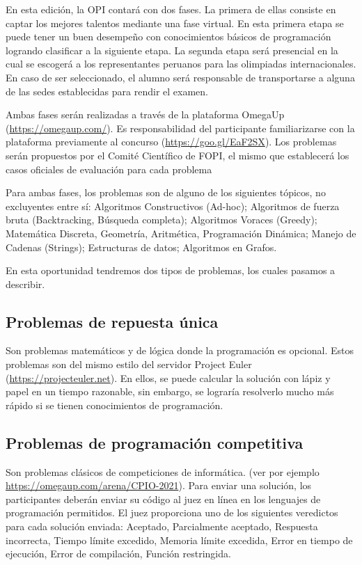 \documentclass{article}
\begin{document}
En esta edición, la OPI contará con dos fases. La primera de ellas consiste en captar los mejores talentos mediante una fase virtual. En esta primera etapa se puede tener un buen desempeño con conocimientos básicos de programación logrando clasificar a la siguiente etapa. La segunda etapa será presencial en la cual se escogerá a los representantes peruanos para las olimpiadas internacionales.
En caso de ser seleccionado, el alumno será responsable de transportarse a alguna de las sedes establecidas para rendir el examen.
 

Ambas fases serán realizadas a través de la plataforma OmegaUp (\url{https://omegaup.com/}).
    Es responsabilidad del participante familiarizarse con la plataforma previamente al concurso (\url{https://goo.gl/EaF2SX}).
      Los problemas serán propuestos por el Comité Científico de FOPI, el mismo que establecerá los casos oficiales de evaluación para cada problema
    
Para ambas fases, los problemas son de alguno de los siguientes tópicos, no excluyentes entre sí:
Algoritmos Constructivos (Ad-hoc);
Algoritmos de fuerza bruta (Backtracking, Búsqueda completa);
Algoritmos Voraces (Greedy);
Matemática Discreta,
Geometría, Aritmética,
Programación Dinámica;
Manejo de Cadenas (Strings);
Estructuras de datos;
Algoritmos en Grafos.

En esta oportunidad tendremos dos tipos de problemas, los cuales pasamos a describir.

\subsection*{Problemas de repuesta única}

Son problemas matemáticos y de lógica donde la programación es opcional.
Estos problemas son del mismo estilo del servidor Project Euler (\url{https://projecteuler.net}).
En ellos, se puede calcular la solución con lápiz y papel en un tiempo razonable, sin embargo, se lograría resolverlo mucho más rápido si se tienen conocimientos de programación.

\subsection*{Problemas de programación competitiva}

Son problemas clásicos de competiciones de informática.
(ver por ejemplo \url{https://omegaup.com/arena/CPIO-2021}). 
 Para enviar una solución, los participantes deberán enviar su código al juez en línea en los lenguajes de programación permitidos.
El juez proporciona uno de los siguientes veredictos para cada solución enviada:
Aceptado,
Parcialmente aceptado,
Respuesta incorrecta,
Tiempo límite excedido,
Memoria límite excedida,
Error en tiempo de ejecución,
Error de compilación,
Función restringida.
\end{document}
